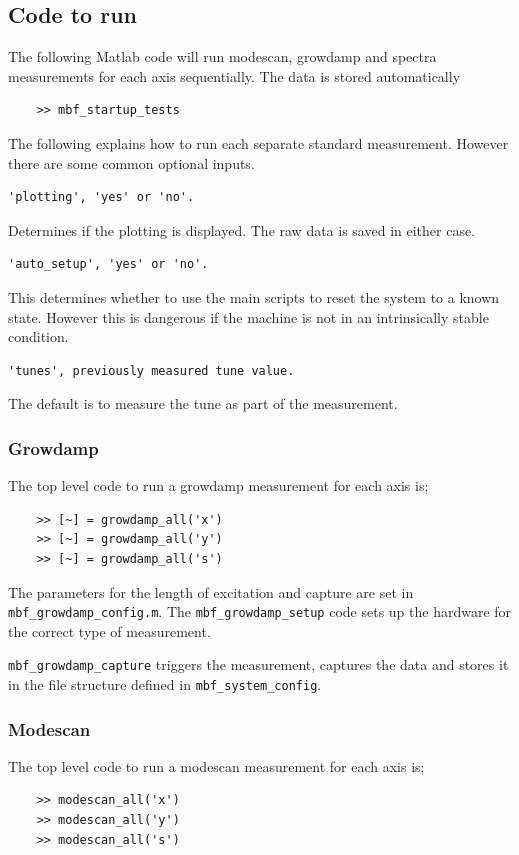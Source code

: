 \documentclass{report}
\begin{document}
\subsection{Code to run}

The following Matlab code will run modescan, growdamp and spectra measurements for each axis sequentially. The data is stored automatically 
\begin{verbatim}
    >> mbf_startup_tests 
\end{verbatim}
\vspace{2mm}
The following explains how to run each separate standard measurement. However there are some common optional inputs.
\begin{verbatim}
'plotting', 'yes' or 'no'. 
\end{verbatim}
Determines if the plotting is displayed. The raw data is saved in either case.
\begin{verbatim}
'auto_setup', 'yes' or 'no'. 
\end{verbatim}
This determines whether to use the main scripts to reset the system to a known state. However this is dangerous if the machine is not in an intrinsically stable condition.
\begin{verbatim}
'tunes', previously measured tune value.
\end{verbatim}
The default is to measure the tune as part of the measurement.
\subsubsection{Growdamp}
The top level code to run a growdamp measurement for each axis is; 
\begin{verbatim}
    >> [~] = growdamp_all('x') 
    >> [~] = growdamp_all('y') 
    >> [~] = growdamp_all('s') 
\end{verbatim}

The parameters for the length of excitation and  capture are set in \verb|mbf_growdamp_config.m|.
 The \verb|mbf_growdamp_setup| code sets up the hardware for the correct type of measurement. 
 
 \verb|mbf_growdamp_capture| triggers the measurement, captures the data and stores it in the file structure defined in \verb|mbf_system_config|. 
\subsubsection{Modescan}
The top level code to run a modescan measurement for each axis is; 
\begin{verbatim}
    >> modescan_all('x') 
    >> modescan_all('y') 
    >> modescan_all('s') 
\end{verbatim}
\end{document}
